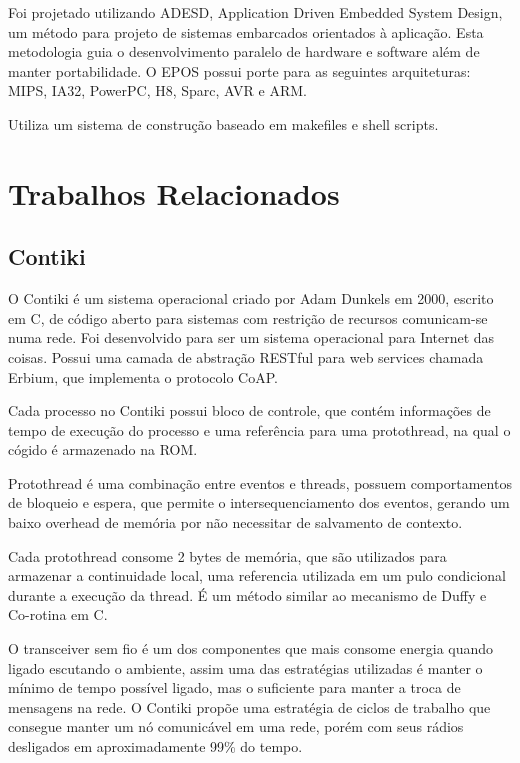 
Foi projetado utilizando ADESD, Application Driven Embedded System Design, um m\'etodo para projeto de sistemas embarcados orientados \`a aplica\c{c}\~ao. Esta metodologia guia o desenvolvimento paralelo de hardware e software al\'em de manter portabilidade. O EPOS possui porte para as seguintes arquiteturas: MIPS, IA32, PowerPC, H8, Sparc, AVR e ARM. \cite{epos}

Utiliza um sistema de constru\c{c}\~ao baseado em makefiles e shell scripts.

\section{Trabalhos Relacionados}

\subsection{Contiki}
O Contiki \'e um sistema operacional criado por Adam Dunkels em 2000, escrito em C, de c\'odigo aberto para sistemas com restri\c{c}\~ao de recursos comunicam-se numa rede. Foi desenvolvido para ser um sistema operacional para Internet das coisas. Possui uma camada de abstra\c{c}\~ao RESTful para web services chamada Erbium, que implementa o protocolo CoAP.

Cada processo no Contiki possui bloco de controle, que cont\'em informa\-\c{c}\~oes de tempo de execu\c{c}\~ao do processo e uma refer\^encia para uma protothread, na qual o c\'ogido \'e armazenado na ROM. 

Protothread \'e uma combina\c{c}\~ao entre eventos e threads, possuem comportamentos de bloqueio e espera, que permite o intersequenciamento dos eventos, gerando um baixo overhead de mem\'oria por n\~ao necessitar de salvamento de contexto.

Cada protothread consome 2 bytes de mem\'oria, que s\~ao utilizados para armazenar a continuidade local, uma referencia utilizada em um pulo condicional durante a execu\c{c}\~ao da thread. \'E um m\'etodo similar ao mecanismo de Duffy e Co-rotina em C. \cite{duffy}

O transceiver sem fio \'e um dos componentes que mais consome energia quando ligado escutando o ambiente, assim uma das estrat\'egias utilizadas \'e manter o m\'inimo de tempo poss\'ivel ligado, mas o suficiente para manter a troca de mensagens na rede. O Contiki prop\~oe uma estrat\'egia de ciclos de trabalho que consegue manter um n\'o comunic\'avel em uma rede, por\'em com seus r\'adios desligados em aproximadamente 99\% do tempo.

